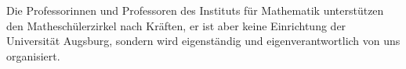 \documentclass[12pt]{zettel}
\begin{document}
Die Professorinnen und Professoren des Instituts für Mathematik unterstützen den Mathe\-schü\-ler\-zir\-kel nach Kräften, er ist aber keine Einrichtung der Universität Augsburg, sondern wird eigenständig und eigenverantwortlich von uns organisiert.
% 
% 
\end{document}
